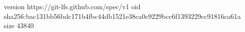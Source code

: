 version https://git-lfs.github.com/spec/v1
oid sha256:bac131bb56bdc171b4fbc44db1521e38ca0c9229bcc6f1393229cc91816ca61a
size 43840
